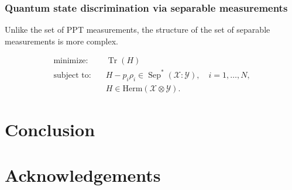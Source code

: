 \documentclass[nofootinbib,superscriptaddress,a4paper,twocolumn,longbibliography,floatfix,pra]{revtex4-2}
\newcommand{\sep}{\operatorname{Sep}}
\renewcommand{\tr}{\operatorname{Tr}}
\newcommand{\setft}[1]{\mathrm{#1}}
\newcommand{\Herm}{\setft{Herm}}
\newcommand{\X}{\mathcal{X}}
\newcommand{\Y}{\mathcal{Y}}
\begin{document}
\subsubsection{Quantum state discrimination via separable measurements}
\label{sec:}
Unlike the set of PPT measurements, the structure of the set of separable
measurements is more complex. 

\begin{minipage}{1in}
\begin{equation} \label{eq:sep-dual}
    \begin{aligned}
      \text{minimize:}\quad & \tr(H) \\
      \text{subject to:}\quad & H - p_i \rho_i \in \sep^*(\X : \Y), \quad i =
        1, \ldots, N, \\
      & H \in \Herm(\X \otimes \Y).
    \end{aligned}
\end{equation}    
\end{minipage}


\section{Conclusion}


\section{Acknowledgements}


\clearpage
\end{document}

